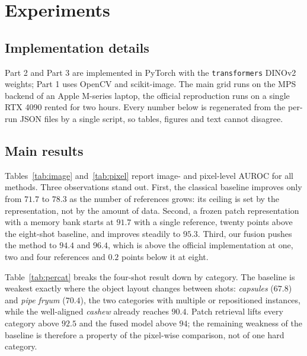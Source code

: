 \documentclass[10pt,twocolumn,letterpaper]{article}
\begin{document}
\section{Experiments}

\subsection{Implementation details}

Part 2 and Part 3 are implemented in PyTorch with the \texttt{transformers}
DINOv2 weights; Part 1 uses OpenCV and scikit-image. The main grid runs on the
MPS backend of an Apple M-series laptop, the official reproduction runs on a
single RTX 4090 rented for two hours. Every number below is regenerated from
the per-run JSON files by a single script, so tables, figures and text cannot
disagree.




\subsection{Main results}

Tables~\ref{tab:image} and~\ref{tab:pixel} report image- and pixel-level AUROC
for all methods. Three observations stand out. First, the classical baseline
improves only from $71.7$ to $78.3$ as the number of references grows: its
ceiling is set by the representation, not by the amount of data. Second, a
frozen patch representation with a memory bank starts at $91.7$ with a single
reference, twenty points above the eight-shot baseline, and improves steadily
to $95.3$. Third, our fusion pushes the method to $94.4$ and $96.4$, which is
above the official implementation at one, two and four references and $0.2$
points below it at eight.

Table~\ref{tab:percat} breaks the four-shot result down by category. The
baseline is weakest exactly where the object layout changes between shots:
\emph{capsules} ($67.8$) and \emph{pipe fryum} ($70.4$), the two categories with
multiple or repositioned instances, while the well-aligned \emph{cashew} already
reaches $90.4$. Patch retrieval lifts every category above $92.5$ and the fused
model above $94$; the remaining weakness of the baseline is therefore a property
of the pixel-wise comparison, not of one hard category.


\end{document}

